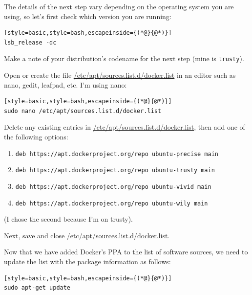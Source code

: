 \documentclass[12pt, a4paper, twoside, openany, titlepage]{book}
\begin{document}
The details of the next step vary depending on the operating system you are using, so let's first check which version you are running:
\begin{lstlisting}[style=basic,style=bash,escapeinside={(*@}{@*)}]
lsb_release -dc
\end{lstlisting}
Make a note of your distribution's codename for the next step (mine is \texttt{trusty}).

Open or create the file \url{/etc/apt/sources.list.d/docker.list} in an editor such as nano, gedit, leafpad, etc. I'm using nano:
\begin{lstlisting}[style=basic,style=bash,escapeinside={(*@}{@*)}]
sudo nano /etc/apt/sources.list.d/docker.list
\end{lstlisting}

Delete any existing entries in \url{/etc/apt/sources.list.d/docker.list}, then add one of the following options:
\begin{enumerate}
\item{\texttt{deb https://apt.dockerproject.org/repo ubuntu-precise main}}
\item{\texttt{deb https://apt.dockerproject.org/repo ubuntu-trusty main}}
\item{\texttt{deb https://apt.dockerproject.org/repo ubuntu-vivid main}}
\item{\texttt{deb https://apt.dockerproject.org/repo ubuntu-wily main}}
\end{enumerate}
(I chose the second because I'm on trusty).


Next, save and close \url{/etc/apt/sources.list.d/docker.list}.

Now that we have added Docker's PPA to the list of software sources, we need to update the list with the package information as follows:
\begin{lstlisting}[style=basic,style=bash,escapeinside={(*@}{@*)}]
sudo apt-get update
\end{lstlisting}
\end{document}
